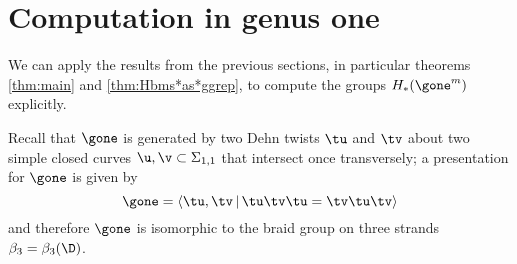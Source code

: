 \section{Computation in genus one}
We can apply the results from the previous sections, in particular theorems \ref{thm:main}
and \ref{thm:Hbms*as*ggrep}, to compute the groups $H_*(\gone^m)$ explicitly.

Recall that $\gone$ is generated by two Dehn twists $\tu$ and $\tv$ about two simple
closed curves $\u,\v\subset\Sigma_{1,1}$ that intersect once transversely; a presentation
for $\gone$ is given by
\[
 \gone=\left<\tu,\tv\, |\, \tu\tv\tu=\tv\tu\tv \right>
\]
and therefore $\gone$ is isomorphic to the braid group on three strands $\beta_3=\beta_3(\D)$.